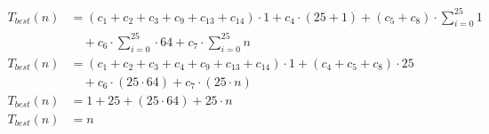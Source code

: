 \begin{subequations}
\label{eq:findlinesegments-best}
\begin{align}
\label{eq:findlinesegments16}
T_{best}(n)& = (c_{1} + c_{2} + c_{3} + c_{9} + c_{13} + c_{14}) \cdot 1 + c_{4} \cdot (25 + 1) + (c_{5} + c_{8})
 \cdot \sum_{i=0}^{25} 1\\
& \quad + c_{6} \cdot \sum_{i=0}^{25} \cdot 64 + c_{7} \cdot \sum_{i=0}^{25} n \nonumber \\
\label{eq:findlinesegments17}
T_{best}(n)& = (c_{1} + c_{2} + c_{3} + c_{4} + c_{9} + c_{13} + c_{14}) \cdot 1 + (c_{4} + c_{5} + c_{8}) \cdot 25 \\
& \quad + c_{6} \cdot (25 \cdot 64) + c_{7} \cdot (25 \cdot n) \nonumber \\
\label{eq:findlinesegments18}
T_{best}(n)& = 1 + 25 + (25 \cdot 64) + 25 \cdot n\\
\label{eq:findlinesegments19}
T_{best}(n)& = n
\end{align}
\end{subequations}
